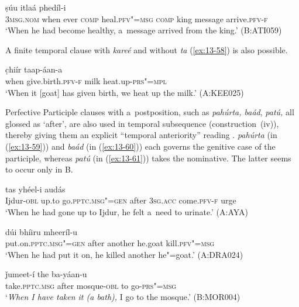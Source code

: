 \begin{exe}
\ex
\label{ex:13-57}
 ṣúu itlaá phedíl-i \\
\textsc{3msg.nom} when ever \textsc{comp} heal.\textsc{pfv"=msg} \textsc{comp} king message arrive.\textsc{pfv-f} \\
\glt `When he had become healthy, a~message arrived from the king.' (B:ATI059) 
\end{exe}

A finite temporal clause with \textit{kareé} and without \textit{ta} (\ref{ex:13-58}) is also possible.

\begin{exe}
\ex
\label{ex:13-58}
 c̣hiír taap-áan-a \\
when give.birth.\textsc{pfv-f} milk heat.up-\textsc{prs"=mpl} \\
\glt `When it [goat] has given birth, we heat up the milk.' (A:KEE025) 
\end{exe}

Perfective Participle clauses with a~postposition, such as \textit{pahúrta, baád}, \textit{patú,} all glossed as `after', are also used in temporal subsequence (construction~(iv)), thereby giving them an explicit ``temporal anteriority'' reading \citep[159]{cristofaro2005}. \textit{pahúrta} (in (\ref{ex:13-59})) and \textit{baád} (in (\ref{ex:13-60})) each governs the genitive case of the participle, whereas \textit{patú} (in (\ref{ex:13-61})) takes the nominative. The latter seems to occur only in B. 

\begin{exe}
\ex
\label{ex:13-59}
\gll [iẓḍúur-a ǰe ɡúum"=ii pahúrta] tas yhéel-i audás \\
Ijdur-\textsc{obl} up.to go.\textsc{pptc.msg"=gen} after \textsc{3sg.acc} come.\textsc{pfv-f} urge \\
\glt `When he had gone up to Ijdur, he felt a~need to urinate.' (A:AYA)

\ex
\label{ex:13-60}
\gll [ṣaawóol"=ii baád] dúi bhíiru mheeríl-u \\
put.on.\textsc{pptc.msg"=gen} after another he.goat kill.\textsc{pfv"=msg}  \\
\glt `When he had put it on, he killed another he"=goat.' (A:DRA024)

\ex
\label{ex:13-61}
 ǰumeet-í the ba-yáan-u  \\
take.\textsc{pptc.msg} after mosque-\textsc{obl} to go-\textsc{prs"=msg} \\
\glt `\textit{When I have taken it (a bath),} I go to the mosque.' (B:MOR004) 
\end{exe}

